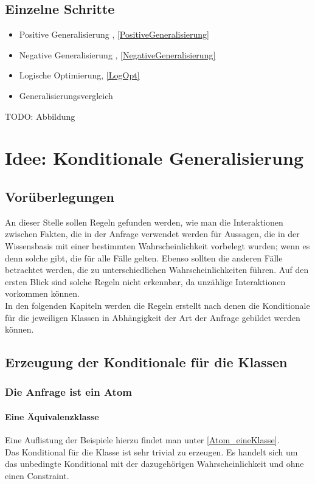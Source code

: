 \documentclass[a4paper, 11pt]{book}
\begin{document}
\subsection{Einzelne Schritte}
\begin{itemize}
	\item Positive Generalisierung , \ref{PositiveGeneralisierung}
	\item Negative Generalisierung , \ref{NegativeGeneralisierung}
	\item Logische Optimierung, \ref{LogOpt}
	\item Generalisierungsvergleich
\end{itemize}
TODO: Abbildung
\section{Idee: Konditionale Generalisierung}
\subsection{Vorüberlegungen}
An dieser Stelle sollen Regeln gefunden werden, wie man die Interaktionen zwischen Fakten, die in der Anfrage verwendet werden für Aussagen, die in der Wissensbasis mit einer bestimmten Wahrscheinlichkeit vorbelegt wurden; wenn es denn solche gibt, die für alle Fälle gelten. Ebenso sollten die anderen Fälle betrachtet werden, die zu unterschiedlichen Wahrscheinlichkeiten führen. Auf den ersten Blick sind solche Regeln nicht erkennbar, da unzählige Interaktionen vorkommen können.\\
In den folgenden Kapiteln werden die Regeln erstellt nach denen die Konditionale für die jeweiligen Klassen in Abhängigkeit der Art der Anfrage gebildet werden können.\\
\subsection{Erzeugung der Konditionale für die Klassen}
\subsubsection {Die Anfrage ist ein Atom} 
\paragraph{ Eine Äquivalenzklasse}
Eine Auflistung der Beispiele hierzu findet man unter \ref{Atom_eineKlasse}.\\
Das Konditional für die Klasse ist sehr trivial zu erzeugen. Es handelt sich um das unbedingte Konditional mit der dazugehörigen Wahrscheinlichkeit und ohne einen Constraint.
\end{document}
